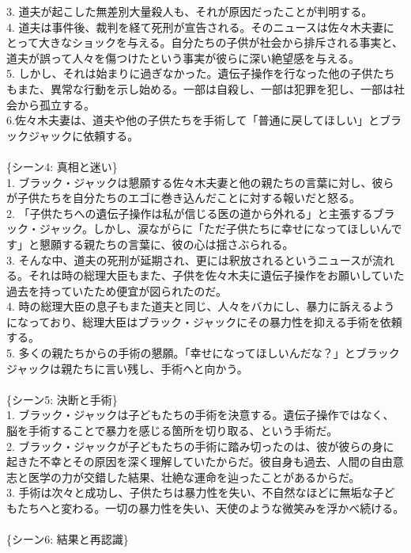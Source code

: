 \documentclass[a4j,12pt]{jsreport}
\begin{document}
\begin{breakitembox}
3. 道夫が起こした無差別大量殺人も、それが原因だったことが判明する。\\
4. 道夫は事件後、裁判を経て死刑が宣告される。そのニュースは佐々木夫妻にとって大きなショックを与える。自分たちの子供が社会から排斥される事実と、道夫が誤って人々を傷つけたという事実が彼らに深い絶望感を与える。\\
5. しかし、それは始まりに過ぎなかった。遺伝子操作を行なった他の子供たちもまた、異常な行動を示し始める。一部は自殺し、一部は犯罪を犯し、一部は社会から孤立する。\\
6.佐々木夫妻は、道夫や他の子供たちを手術して「普通に戻してほしい」とブラックジャックに依頼する。\\
\\
 \{シーン4: 真相と迷い\}\\
1. ブラック・ジャックは懇願する佐々木夫妻と他の親たちの言葉に対し、彼らが子供たちを自分たちのエゴに巻き込んだことに対する報いだと怒る。\\
2. 「子供たちへの遺伝子操作は私が信じる医の道から外れる」と主張するブラック・ジャック。しかし、涙ながらに「ただ子供たちに幸せになってほしいんです」と懇願する親たちの言葉に、彼の心は揺さぶられる。\\
3. そんな中、道夫の死刑が延期され、更には釈放されるというニュースが流れる。それは時の総理大臣もまた、子供を佐々木夫に遺伝子操作をお願いしていた過去を持っていたため便宜が図られたのだ。\\
4. 時の総理大臣の息子もまた道夫と同じ、人々をバカにし、暴力に訴えるようになっており、総理大臣はブラック・ジャックにその暴力性を抑える手術を依頼する。\\
5. 多くの親たちからの手術の懇願。「幸せになってほしいんだな？」とブラックジャックは親たちに言い残し、手術へと向かう。\\
\\
 \{シーン5: 決断と手術\}\\
1. ブラック・ジャックは子どもたちの手術を決意する。遺伝子操作ではなく、脳を手術することで暴力を感じる箇所を切り取る、という手術だ。\\
2. ブラック・ジャックが子どもたちの手術に踏み切ったのは、彼が彼らの身に起きた不幸とその原因を深く理解していたからだ。彼自身も過去、人間の自由意志と医学の力が交錯した結果、壮絶な運命を辿ったことがあるからだ。\\
3. 手術は次々と成功し、子供たちは暴力性を失い、不自然なほどに無垢な子どもたちへと変わる。一切の暴力性を失い、天使のような微笑みを浮かべ続ける。\\
\\
 \{シーン6: 結果と再認識\}\\

\end{breakitembox}
\end{document}

